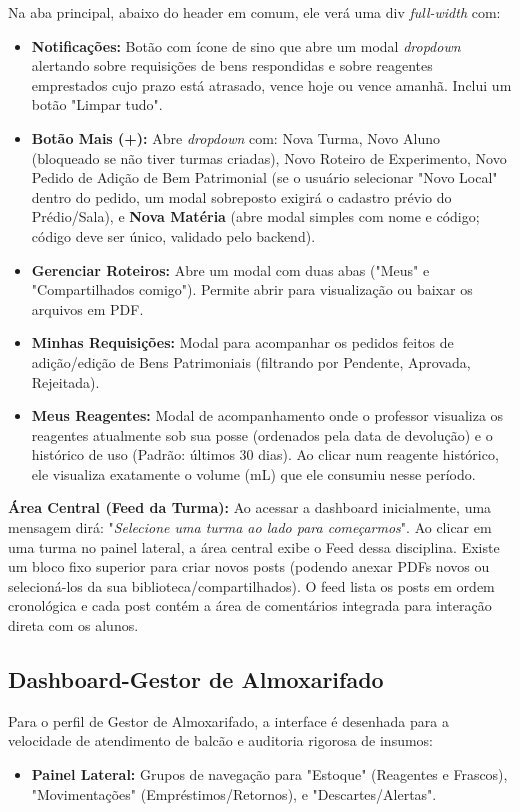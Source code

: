 \documentclass[12pt,a4paper]{article}
\begin{document}
Na aba principal, abaixo do header em comum, ele verá uma div \textit{full-width} com:
\begin{itemize}
    \item \textbf{Notificações:} Botão com ícone de sino que abre um modal \textit{dropdown} alertando sobre requisições de bens respondidas e sobre reagentes emprestados cujo prazo está atrasado, vence hoje ou vence amanhã. Inclui um botão "Limpar tudo".
    \item \textbf{Botão Mais (+):} Abre \textit{dropdown} com: Nova Turma, Novo Aluno (bloqueado se não tiver turmas criadas), Novo Roteiro de Experimento, Novo Pedido de Adição de Bem Patrimonial (se o usuário selecionar "Novo Local" dentro do pedido, um modal sobreposto exigirá o cadastro prévio do Prédio/Sala), e \textbf{Nova Matéria} (abre modal simples com nome e código; código deve ser único, validado pelo backend).
    \item \textbf{Gerenciar Roteiros:} Abre um modal com duas abas ("Meus" e "Compartilhados comigo"). Permite abrir para visualização ou baixar os arquivos em PDF.
    \item \textbf{Minhas Requisições:} Modal para acompanhar os pedidos feitos de adição/edição de Bens Patrimoniais (filtrando por Pendente, Aprovada, Rejeitada).
    \item \textbf{Meus Reagentes:} Modal de acompanhamento onde o professor visualiza os reagentes atualmente sob sua posse (ordenados pela data de devolução) e o histórico de uso (Padrão: últimos 30 dias). Ao clicar num reagente histórico, ele visualiza exatamente o volume (mL) que ele consumiu nesse período.
\end{itemize} 

\textbf{Área Central (Feed da Turma):}
Ao acessar a dashboard inicialmente, uma mensagem dirá: "\textit{Selecione uma turma ao lado para começarmos}". 
Ao clicar em uma turma no painel lateral, a área central exibe o Feed dessa disciplina. Existe um bloco fixo superior para criar novos posts (podendo anexar PDFs novos ou selecioná-los da sua biblioteca/compartilhados). O feed lista os posts em ordem cronológica e cada post contém a área de comentários integrada para interação direta com os alunos.

\subsection{Dashboard-Gestor de Almoxarifado}
Para o perfil de Gestor de Almoxarifado, a interface é desenhada para a velocidade de atendimento de balcão e auditoria rigorosa de insumos:
\begin{itemize}
    \item \textbf{Painel Lateral:} Grupos de navegação para "Estoque" (Reagentes e Frascos), "Movimentações" (Empréstimos/Retornos), e "Descartes/Alertas".
\end{itemize}
\end{document}
